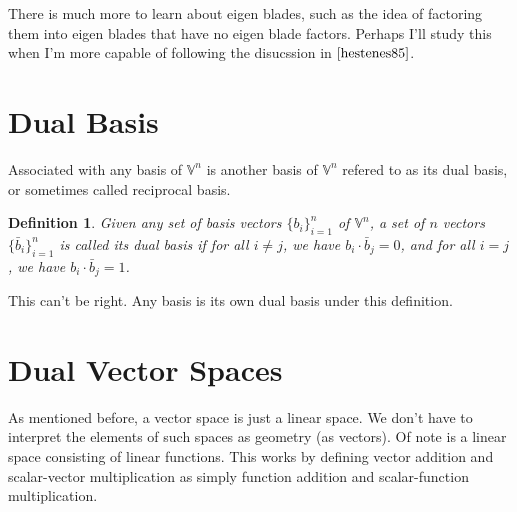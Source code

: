 \documentclass[12pt]{article}
\newcommand{\V}{\mathbb{V}}
\newtheorem{definition}{Definition}[section]
\begin{document}
There is much more to learn about eigen blades, such as the idea of factoring them into
eigen blades that have no eigen blade factors.  Perhaps I'll study this when I'm more capable
of following the disucssion in $\cite{hestenes85}$.

\section{Dual Basis}


Associated with any basis of $\V^n$ is another basis of $\V^n$ refered to as its dual basis,
or sometimes called reciprocal basis.
\begin{definition}
Given any set of basis vectors $\{b_i\}_{i=1}^n$ of $\V^n$, a set of $n$ vectors
$\{\bar{b}_i\}_{i=1}^n$ is called its dual basis if for all $i\neq j$, we
have $b_i\cdot\bar{b}_j=0$, and for all $i=j$, we have $b_i\cdot\bar{b}_j=1$.
\end{definition}
This can't be right.  Any basis is its own dual basis under this definition.

\section{Dual Vector Spaces}

As mentioned before, a vector space is just a linear space.  We don't have to interpret the
elements of such spaces as geometry (as vectors).  Of note is a linear space consisting of
linear functions.  This works by defining vector addition and scalar-vector multiplication as
simply function addition and scalar-function multiplication.




\end{document}
